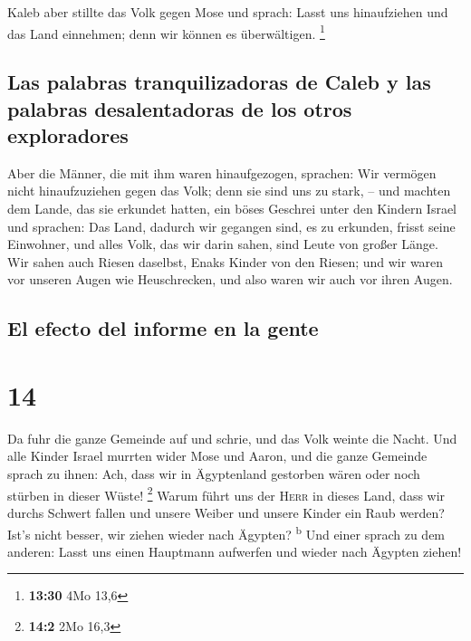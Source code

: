  Kaleb aber stillte das Volk gegen Mose und sprach: Lasst
uns hinaufziehen und das Land einnehmen; denn wir können es
überwältigen. \footnote{\textbf{13:30} 4Mo 13,6}

\hypertarget{las-palabras-tranquilizadoras-de-caleb-y-las-palabras-desalentadoras-de-los-otros-exploradores}{%
\subsection{Las palabras tranquilizadoras de Caleb y las palabras
desalentadoras de los otros
exploradores}\label{las-palabras-tranquilizadoras-de-caleb-y-las-palabras-desalentadoras-de-los-otros-exploradores}}

 Aber die Männer, die mit ihm waren hinaufgezogen,
sprachen: Wir vermögen nicht hinaufzuziehen gegen das Volk; denn sie
sind uns zu stark, --  und machten dem Lande, das sie
erkundet hatten, ein böses Geschrei unter den Kindern Israel und
sprachen: Das Land, dadurch wir gegangen sind, es zu erkunden, frisst
seine Einwohner, und alles Volk, das wir darin sahen, sind Leute von
großer Länge.  Wir sahen auch Riesen daselbst, Enaks
Kinder von den Riesen; und wir waren vor unseren Augen wie Heuschrecken,
und also waren wir auch vor ihren Augen.

\hypertarget{el-efecto-del-informe-en-la-gente}{%
\subsection{El efecto del informe en la
gente}\label{el-efecto-del-informe-en-la-gente}}

\hypertarget{section-13}{%
\section{14}\label{section-13}}

 Da fuhr die ganze Gemeinde auf und schrie, und das Volk
weinte die Nacht.  Und alle Kinder Israel murrten wider
Mose und Aaron, und die ganze Gemeinde sprach zu ihnen: Ach, dass wir in
Ägyptenland gestorben wären oder noch stürben in dieser Wüste!
\footnote{\textbf{14:2} 2Mo 16,3}  Warum führt uns der
\textsc{Herr} in dieses Land, dass wir durchs Schwert fallen und unsere
Weiber und unsere Kinder ein Raub werden? Ist's nicht besser, wir ziehen
wieder nach Ägypten? \textsuperscript{b}  Und einer sprach
zu dem anderen: Lasst uns einen Hauptmann aufwerfen und wieder nach
Ägypten ziehen!


